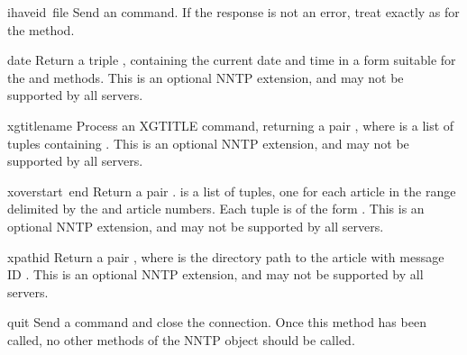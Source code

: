 \begin{funcdesc}{ihave}{id\, file}
Send an  command.  If the response is not an error, treat
 exactly as for the  method.
\end{funcdesc}

\begin{funcdesc}{date}{}
Return a triple ,
containing the current date and time in a form suitable for the
 and  methods.
This is an optional NNTP extension, and may not be supported by all
servers.
\end{funcdesc}

\begin{funcdesc}{xgtitle}{name}
Process an XGTITLE command, returning a pair , where  is a list of tuples containing
.
This is an optional NNTP extension, and may not be supported by all
servers.
\end{funcdesc}

\begin{funcdesc}{xover}{start\, end}
Return a pair .   is a list
of tuples, one for each article in the range delimited by the 
and  article numbers.  Each tuple is of the form
.
This is an optional NNTP extension, and may not be supported by all
servers.
\end{funcdesc}

\begin{funcdesc}{xpath}{id}
Return a pair , where  is the
directory path to the article with message ID .  This is an
optional NNTP extension, and may not be supported by all servers.
\end{funcdesc}

\begin{funcdesc}{quit}{}
Send a  command and close the connection.  Once this method
has been called, no other methods of the NNTP object should be called.
\end{funcdesc}

